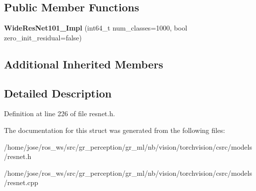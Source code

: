 \subsection*{Public Member Functions}
\begin{DoxyCompactItemize}
\item 
\mbox{\label{structvision_1_1models_1_1WideResNet101__2Impl_ae29338b5915bf93ebaa20006103728e8}} 
{\bfseries Wide\+Res\+Net101\+\_\+Impl} (int64\+\_\+t num\+\_\+classes=1000, bool zero\+\_\+init\+\_\+residual=false)
\end{DoxyCompactItemize}
\subsection*{Additional Inherited Members}


\subsection{Detailed Description}


Definition at line 226 of file resnet.\+h.



The documentation for this struct was generated from the following files\+:\begin{DoxyCompactItemize}
\item 
/home/jose/ros\+\_\+ws/src/gr\+\_\+perception/gr\+\_\+ml/nb/vision/torchvision/csrc/models/resnet.\+h\item 
/home/jose/ros\+\_\+ws/src/gr\+\_\+perception/gr\+\_\+ml/nb/vision/torchvision/csrc/models/resnet.\+cpp\end{DoxyCompactItemize}

